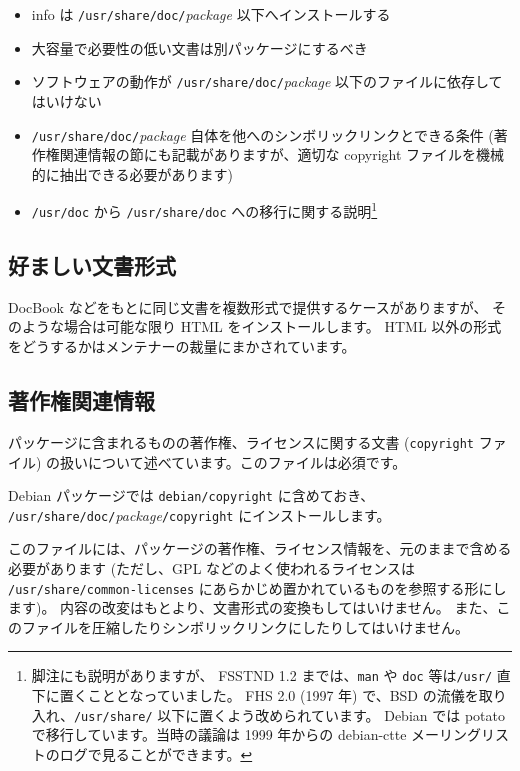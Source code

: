 \documentclass[mingoth,a4paper]{jsarticle}
\begin{document}
\begin{itemize}
\item info は {\tt /usr/share/doc/}{\it package} 以下へインストールする
\item 大容量で必要性の低い文書は別パッケージにするべき
\item ソフトウェアの動作が {\tt /usr/share/doc/}{\it package} 以下のファイルに依存してはいけない
\item {\tt /usr/share/doc/}{\it package} 自体を他へのシンボリックリンクとできる条件 (著作権関連情報の節にも記載がありますが、適切な copyright ファイルを機械的に抽出できる必要があります)
\item {\tt /usr/doc} から {\tt /usr/share/doc} への移行に関する説明\footnote{脚注にも説明がありますが、
FSSTND 1.2 までは、{\tt man} や {\tt doc} 等は{\tt /usr/} 直下に置くこととなっていました。
FHS 2.0 (1997 年) で、BSD の流儀を取り入れ、{\tt /usr/share/} 以下に置くよう改められています。
Debian では potato で移行しています。当時の議論は 1999 年からの debian-ctte メーリングリストのログで見ることができます。}
\end{itemize}

\subsection{好ましい文書形式}

DocBook などをもとに同じ文書を複数形式で提供するケースがありますが、
そのような場合は可能な限り HTML をインストールします。
HTML 以外の形式をどうするかはメンテナーの裁量にまかされています。

\subsection{著作権関連情報}

パッケージに含まれるものの著作権、ライセンスに関する文書 ({\tt copyright} ファイル) の扱いについて述べています。このファイルは必須です。

Debian パッケージでは {\tt debian/copyright} に含めておき、
{\tt /usr/share/doc/}{\it package}{\tt /copyright} にインストールします。

このファイルには、パッケージの著作権、ライセンス情報を、元のままで含める必要があります
(ただし、GPL などのよく使われるライセンスは {\tt /usr/share/common-licenses} にあらかじめ置かれているものを参照する形にします)。
内容の改変はもとより、文書形式の変換もしてはいけません。
また、このファイルを圧縮したりシンボリックリンクにしたりしてはいけません。
\end{document}
